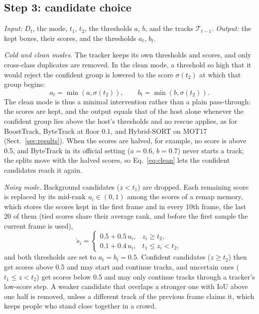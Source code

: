 \subsection{Step 3: candidate choice}\label{sec:choice}
\emph{Input:} $D_t$, the mode, $t_1$, $t_2$, the thresholds $a$, $b$, and the tracks
$\mathcal{T}_{t-1}$. \emph{Output:} the kept boxes, their scores, and the thresholds $a_t$, $b_t$.

\emph{Cold and clean modes.} The tracker keeps its own thresholds and scores, and only cross-class
duplicates are removed. In the clean mode, a threshold so high that it would reject the confident
group is lowered to the score $\sigma(t_2)$ at which that group begins:
\begin{equation}
a_t=\min\!\left(a,\sigma(t_2)\right),\qquad b_t=\min\!\left(b,\sigma(t_2)\right).
\label{eq:clean}
\end{equation}
The clean mode is thus a minimal intervention rather than a plain pass-through: the scores are
kept, and the output equals that of the host alone whenever the confident group lies above the
host's thresholds and no rescue applies, as for BoostTrack, ByteTrack at floor 0.1, and Hybrid-SORT
on MOT17 (Sect.~\ref{sec:results}). When the scores are halved, for example, no score is above 0.5,
and ByteTrack in its official setting ($a=0.6$, $b=0.7$) never starts a track; the splits move with
the halved scores, so Eq.~\eqref{eq:clean} lets the confident candidates reach it again.

\emph{Noisy mode.} Background candidates ($z<t_1$) are dropped. Each remaining score is
replaced by its mid-rank $u_i\in(0,1)$ among the scores of a remap memory, which stores the scores
kept in the first frame and in every 10th frame, the last 20 of them (tied scores share their
average rank, and before the first sample the current frame is used),
\begin{equation}
\tilde{s}_i=
\begin{cases}
0.5+0.5\,u_i, & z_i\ge t_2,\\
0.1+0.4\,u_i, & t_1\le z_i<t_2,
\end{cases}
\label{eq:remap}
\end{equation}
and both thresholds are set to $a_t=b_t=0.5$. Confident candidates ($z\ge t_2$) then get scores above 0.5
and may start and continue tracks, and uncertain ones ($t_1\le z<t_2$) get scores below 0.5 and may
only continue tracks through a tracker's low-score step. A weaker
candidate that overlaps a stronger one with IoU above one half is removed, unless a different track
of the previous frame claims it, which keeps people who stand close together in a crowd.

